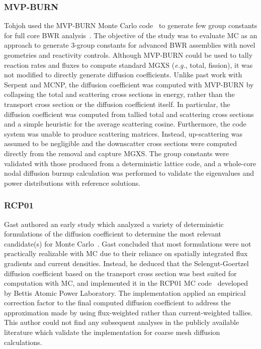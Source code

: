 \subsubsection{MVP-BURN}
\label{subsec:chap3-lit-review-diffusion-mvp-burn}

Tohjoh used the MVP-BURN Monte Carlo code~\cite{okumura2000validation} to generate few group constants for full core \ac{BWR} analysis~\cite{tohjoh2005application}. The objective of the study was to evaluate \ac{MC} as an approach to generate 3-group constants for advanced \ac{BWR} assemblies with novel geometries and reactivity controls. Although MVP-BURN could be used to tally reaction rates and fluxes to compute standard \ac{MGXS} (\textit{e.g.}, total, fission), it was not modified to directly generate diffusion coefficients. Unlike past work with Serpent and MCNP, the diffusion coefficient was computed with MVP-BURN by collapsing the total and scattering cross sections in energy, rather than the transport cross section or the diffusion coefficient itself. In particular, the diffusion coefficient was computed from tallied total and scattering cross sections and a simple heuristic for the average scattering cosine. Furthermore, the code system was unable to produce scattering matrices. Instead, up-scattering was assumed to be negligible and the downscatter cross sections were computed directly from the removal and capture \ac{MGXS}. The group constants were validated with those produced from a deterministic lattice code, and a whole-core nodal diffusion burnup calculation was performed to validate the eigenvalues and power distributions with reference solutions.

\subsubsection{RCP01}
\label{subsec:chap3-lit-review-diffusion-rcp01}

Gast authored an early study which analyzed a variety of deterministic formulations of the diffusion coefficient to determine the most relevant candidate(s) for Monte Carlo~\cite{gast1981procedure}. Gast concluded that most formulations were not practically realizable with \ac{MC} due to their reliance on spatially integrated flux gradients and current densities. Instead, he deduced that the Selengut-Goertzel diffusion coefficient based on the transport cross section was best suited for computation with \ac{MC}, and implemented it in the RCP01 \ac{MC} code~\cite{ondis2000rcp01} developed by Bettis Atomic Power Laboratory. The implementation applied an empirical correction factor to the final computed diffusion coefficient to address the approximation made by using flux-weighted rather than current-weighted tallies. This author could not find any subsequent analyses in the publicly available literature which validate the implementation for coarse mesh diffusion calculations.

